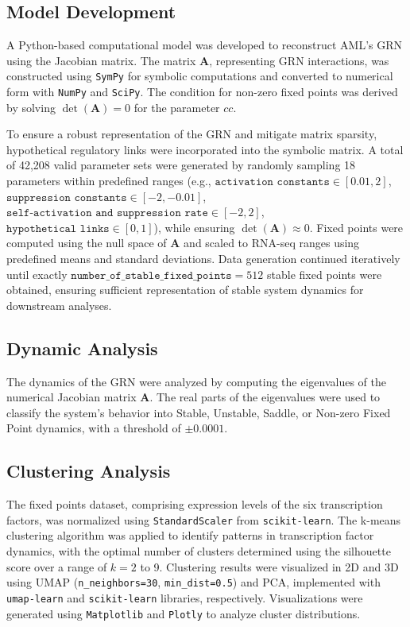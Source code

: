 \documentclass[a4paper,12pt]{article}
\begin{document}
\subsection{Model Development}
\label{subsec:model_development}
A Python-based computational model was developed to reconstruct AML’s GRN using the Jacobian matrix. The matrix \( \mathbf{A} \), representing GRN interactions, was constructed using \texttt{SymPy} for symbolic computations and converted to numerical form with \texttt{NumPy} and \texttt{SciPy}. The condition for non-zero fixed points was derived by solving \( \det(\mathbf{A}) = 0 \) for the parameter \( cc \).

To ensure a robust representation of the GRN and mitigate matrix sparsity, hypothetical regulatory links were incorporated into the symbolic matrix. A total of 42,208 valid parameter sets were generated by randomly sampling 18 parameters within predefined ranges (e.g., \( \texttt{activation constants} \in [0.01, 2] \), \( \texttt{suppression constants} \in [-2, -0.01] \), \( \texttt{self-activation and suppression rate} \in [-2, 2] \), \( \texttt{hypothetical links} \in [0, 1] \)), while ensuring \( \det(\mathbf{A}) \approx 0 \). Fixed points were computed using the null space of \( \mathbf{A} \) and scaled to RNA-seq ranges using predefined means and standard deviations. Data generation continued iteratively until exactly \( \texttt{number\_of\_stable\_fixed\_points} = 512 \) stable fixed points were obtained, ensuring sufficient representation of stable system dynamics for downstream analyses.


\subsection{Dynamic Analysis}
\label{subsec:dynamic_analysis}
The dynamics of the GRN were analyzed by computing the eigenvalues of the numerical Jacobian matrix \( \mathbf{A} \). The real parts of the eigenvalues were used to classify the system’s behavior into Stable, Unstable, Saddle, or Non-zero Fixed Point dynamics, with a threshold of \( \pm 0.0001 \). 

\subsection{Clustering Analysis}
\label{subsec:clustering}
The fixed points dataset, comprising expression levels of the six transcription factors, was normalized using \texttt{StandardScaler} from \texttt{scikit-learn}. The k-means clustering algorithm was applied to identify patterns in transcription factor dynamics, with the optimal number of clusters determined using the silhouette score over a range of \( k = 2 \) to 9. Clustering results were visualized in 2D and 3D using UMAP (\texttt{n\_neighbors=30}, \texttt{min\_dist=0.5}) and PCA, implemented with \texttt{umap-learn} and \texttt{scikit-learn} libraries, respectively. Visualizations were generated using \texttt{Matplotlib} and \texttt{Plotly} to analyze cluster distributions.
\end{document}
